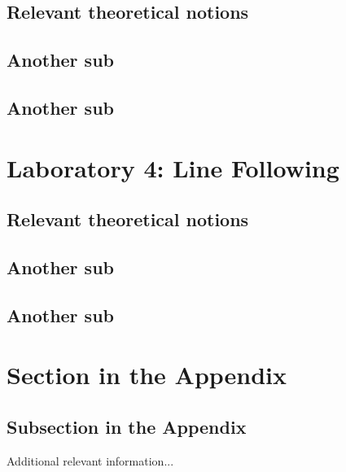 \documentclass[english]{article}
\begin{document}
\subsection{Relevant theoretical notions}

\subsection{Another sub}

\subsection{Another sub}

\newpage
\section{Laboratory 4: Line Following}

\subsection{Relevant theoretical notions}

\subsection{Another sub}

\subsection{Another sub}

\clearpage
\appendix

\section{Section in the Appendix}
\label{sec:app1}

\subsection{Subsection in the Appendix}
\label{subsec:app2}

Additional relevant information...
\end{document}
